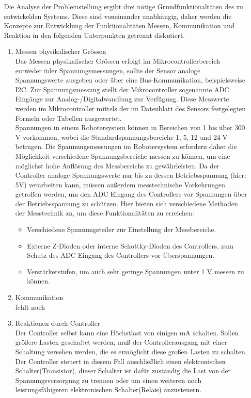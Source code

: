 \documentclass[
	11pt,								%
	a4paper,						%
	oneside,						%
	titlepage,					%
	headsepline,				%
	DIV13,							%
	abstracton,	 				%
	BCOR0cm,						%
	bibliography=totoc, %
]{scrreprt}							%
\begin{document}
Die Analyse der Problemstellung ergibt drei nötige Grundfunktionaltäten des zu entwickelden Systems. Diese sind voneinander unabhängig, 
daher werden die Konzepte zur Entwicklung der Funktionalitäten Messen, Kommunikation und Reaktion in den folgenden Unterpunkten getrennt diskutiert.\\
\begin{enumerate}
  \item Messen physikalischer Grössen\\
  Das Messen physikalischer Grössen erfolgt im Mikrocontrollerbereich entweder üder Spannungsmessungen, sollte der Sensor
  analoge Spannungswerte ausgeben oder über eine Bus-Kommunikation, beispielsweise I2C. Zur Spannungsmessung stellt der Mikrocontroller
  sogenannte ADC Eingänge zur Analog-/Digitalwandlung zur Verfügung.
  Diese Messwerte werden im Mikrocontroller mittels der im Datenblatt des Sensors festgelegten Formeln oder Tabellen ausgewertet.\\
  Spannungen in einem Robotersystem können in Bereichen von 1 bis über 300 V vorkommen, wobei die Standardspannungsbereiche 1, 5, 12 und 24 V betragen.
  Die Spannungsmessungen im Robotersystem erfordern daher die Möglichkeit verschiedene Spannungsbereiche messen zu können,
  um eine möglichst hohe Auflösung des Messbereichs zu gewährleisten. Da der Controller analoge Spannungswerte nur bis zu dessen Betriebsspannung (hier: 5V) verarbeiten kann, 
  müssen außerdem messtechnische Vorkehrungen getroffen werden, um den ADC Eingang des Controllers vor Spannungen über der Betriebsspannung zu schützen.
  Hier bieten sich verschiedene Methoden der Messtechnik an, um diese Funktionalitäten zu erreichen:
  \begin{itemize}
   \item  Verschiedene Spannungsteiler zur Einstellung der Messbereiche.
   \item  Externe Z-Dioden oder interne Schottky-Dioden des Controllers, zum Schutz des ADC Eingang des Controllers vor Überspannungen.
   \item  Verstärkerstufen, um auch sehr geringe Spannungen unter 1 V messen zu können.
  \end{itemize}

  
  \item Kommunikation\\
  
  fehlt noch
  
  \item Reaktionen durch Controller\\
Der Controller selbst kann eine Höchstlast von einigen mA schalten. Sollen größere Lasten geschaltet werden, muß der Controllerausgang
mit einer Schaltung versehen werden, die es ermöglicht diese großen Lasten zu schalten. Der Controller steuert in diesem Fall auschließlich einen elektronischen
Schalter(Transistor), dieser Schalter ist dafür zuständig die Last von der Spannungsversorgung zu trennen oder um einen weiteren noch leistungsfähigeren elektronischen Schalter(Relais) anzusteuern.
\end{enumerate}
\end{document}
